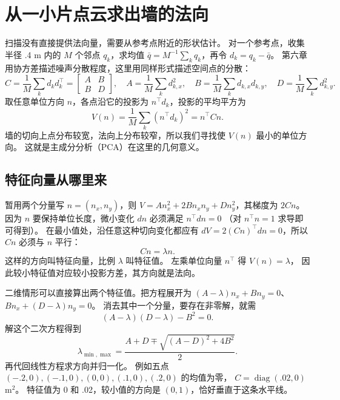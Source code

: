 \section{从一小片点云求出墙的法向}
扫描没有直接提供法向量，需要从参考点附近的形状估计。
对一个参考点，收集半径 .4 m 内的 $M$ 个邻点 $q_k$，求均值
$\bar q=M^{-1}\sum_kq_k$，再令 $d_k=q_k-\bar q$。
第六章用协方差描述噪声分散程度，这里用同样形式描述空间点的分散：
\begin{equation}
C=\frac1M\sum_kd_kd_k^\top
=\begin{bmatrix}A&B\\B&D\end{bmatrix},\quad
A=\frac1M\sum_kd_{k,x}^2,\quad
B=\frac1M\sum_kd_{k,x}d_{k,y},\quad
D=\frac1M\sum_kd_{k,y}^2.
\end{equation}
取任意单位方向 $n$，各点沿它的投影为 $n^\top d_k$，投影的平均平方为
\begin{equation}
V(n)=\frac1M\sum_k(n^\top d_k)^2=n^\top Cn.
\end{equation}
墙的切向上点分布较宽，法向上分布较窄，所以我们寻找使 $V(n)$ 最小的单位方向。
这就是主成分分析（PCA）在这里的几何意义。

\subsection{特征向量从哪里来}
暂用两个分量写 $n=(n_x,n_y)$，则
$V=An_x^2+2Bn_xn_y+Dn_y^2$，其梯度为 $2Cn$。
因为 $n$ 要保持单位长度，微小变化 $dn$ 必须满足 $n^\top dn=0$
（对 $n^\top n=1$ 求导即可得到）。
在最小值处，沿任意这种切向变化都应有
$dV=2(Cn)^\top dn=0$，所以 $Cn$ 必须与 $n$ 平行：
\begin{equation}
Cn=\lambda n.
\end{equation}
这样的方向叫特征向量，比例 $\lambda$ 叫特征值。
左乘单位向量 $n^\top$ 得 $V(n)=\lambda$，
因此较小特征值对应较小投影方差，其方向就是法向。

二维情形可以直接算出两个特征值。把方程展开为
$(A-\lambda)n_x+Bn_y=0$、$Bn_x+(D-\lambda)n_y=0$。
消去其中一个分量，要存在非零解，就需
\[
(A-\lambda)(D-\lambda)-B^2=0.
\]
解这个二次方程得到
\begin{equation}
\lambda_{\min,\max}=\frac{A+D\mp\sqrt{(A-D)^2+4B^2}}2.
\end{equation}
再代回线性方程求方向并归一化。
例如五点 $(-.2,0),(-.1,0),(0,0),(.1,0),(.2,0)$ 的均值为零，
$C=\operatorname{diag}(.02,0)$ $\mathrm{m^2}$。
特征值为 0 和 .02，较小值的方向是 $(0,1)$，恰好垂直于这条水平线。

